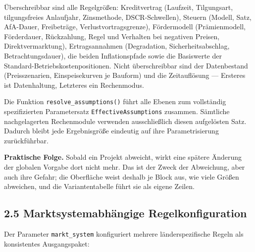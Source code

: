\documentclass[
  a4paper,
  10pt]{article}
\renewenvironment{quote}
  {\begin{tcolorbox}[
      enhanced,
      breakable,
      colback=Wash,
      colframe=Brand,
      boxrule=0pt,
      leftrule=2.2pt,
      arc=0pt,
      left=8pt,right=8pt,top=6pt,bottom=6pt,
      before skip=8pt,after skip=9pt
    ]\small\color{InkSoft}}
  {\end{tcolorbox}}
\begin{document}
Überschreibbar sind alle Regelgrößen: Kreditvertrag (Laufzeit,
Tilgungsart, tilgungsfreies Anlaufjahr, Zinsmethode, DSCR-Schwellen),
Steuern (Modell, Satz, AfA-Dauer, Freibeträge, Verlustvortragsgrenze),
Fördermodell (Prämienmodell, Förderdauer, Rückzahlung, Regel und
Verhalten bei negativen Preisen, Direktvermarktung), Ertragsannahmen
(Degradation, Sicherheitsabschlag, Betrachtungsdauer), die beiden
Inflationspfade sowie die Basiswerte der
Standard-Betriebskostenpositionen. Nicht überschreibbar sind der
Datenbestand (Preisszenarien, Einspeisekurven je Bauform) und die
Zeitauflösung --- Ersteres ist Datenhaltung, Letzteres ein Rechenmodus.

Die Funktion \texttt{resolve\_assumptions()} führt alle Ebenen zum
vollständig spezifizierten Parametersatz \texttt{EffectiveAssumptions}
zusammen. Sämtliche nachgelagerten Rechenmodule verwenden ausschließlich
diesen aufgelösten Satz. Dadurch bleibt jede Ergebnisgröße eindeutig auf
ihre Parametrisierung zurückführbar.

\begin{quote}
\textbf{Praktische Folge.} Sobald ein Projekt abweicht, wirkt eine
spätere Änderung der globalen Vorgabe dort nicht mehr. Das ist der Zweck
der Abweichung, aber auch ihre Gefahr; die Oberfläche weist deshalb je
Block aus, wie viele Größen abweichen, und die Variantentabelle führt
sie als eigene Zeilen.
\end{quote}

\hypertarget{marktsystemabhuxe4ngige-regelkonfiguration}{%
\subsection{2.5 Marktsystemabhängige
Regelkonfiguration}\label{marktsystemabhuxe4ngige-regelkonfiguration}}

Der Parameter \texttt{markt\_system} konfiguriert mehrere
länderspezifische Regeln als konsistentes Ausgangspaket:
\end{document}
